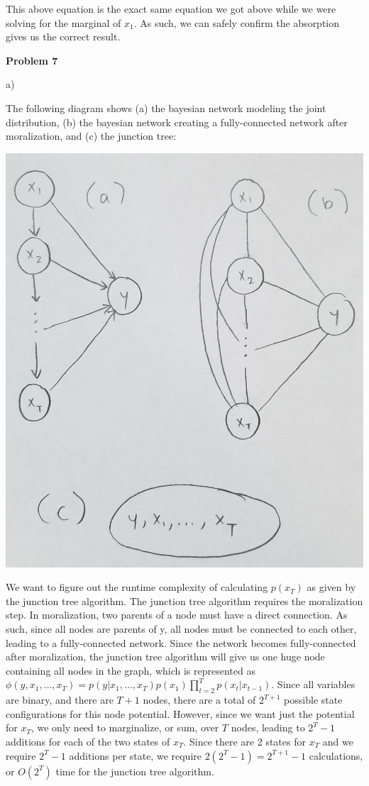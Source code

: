 \documentclass[12pt]{article}
\begin{document}
This above equation is the exact same equation we got above while we were solving for the marginal of $x_1$. As such, we can safely confirm the absorption gives us the correct result.

\pagebreak\textbf{Problem 7}

a) 

The following diagram shows (a) the bayesian network modeling the joint distribution, (b) the bayesian network creating a fully-connected network after moralization, and (c) the junction tree:

\includegraphics[scale=0.1]{q7-trees}

We want to figure out the runtime complexity of calculating $p(x_T)$ as given by the junction tree algorithm. The junction tree algorithm requires the moralization step. In moralization, two parents of a node must have a direct connection. As such, since all nodes are parents of y, all nodes must be connected to each other, leading to a fully-connected network. Since the network becomes fully-connected after moralization, the junction tree algorithm will give us one huge node containing all nodes in the graph, which is represented as $\phi(y, x_1, \dots, x_T) = p(y \vert x_1, \dots, x_T)p(x_1)\prod_{t = 2}^{T} p(x_t \vert x_{t-1})$. Since all variables are binary, and there are $T+1$ nodes, there are a total of $2^{T+1}$ possible state configurations for this node potential. However, since we want just the potential for $x_T$, we only need to marginalize, or sum, over $T$ nodes, leading to $2^T-1$ additions for each of the two states of $x_T$. Since there are 2 states for $x_T$ and we require $2^T - 1$ additions per state, we require $2(2^T - 1) = 2^{T+1} - 1$ calculations, or $O(2^T)$ time for the junction tree algorithm.
\end{document}
